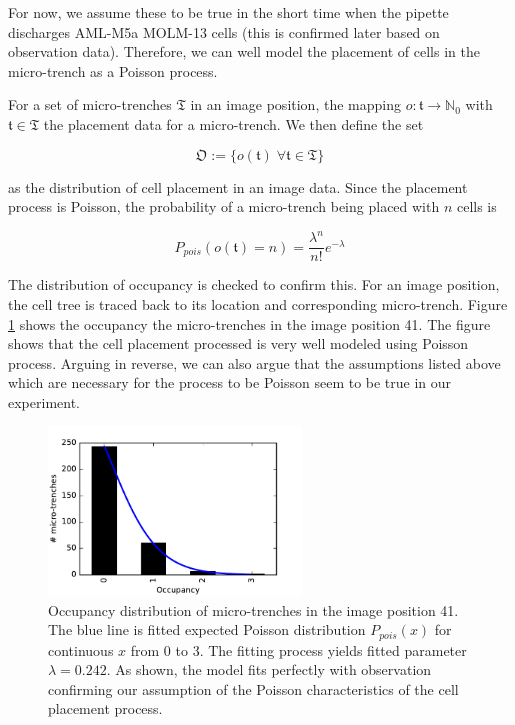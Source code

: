 \documentclass[pdftex,12pt,a4paper]{report}
\begin{document}
For now, we assume these to be true in the short time when the pipette discharges AML-M5a MOLM-13 cells (this is confirmed later based on observation data). Therefore, we can well model the placement of cells in the micro-trench as a Poisson process.

For a set of micro-trenches $\mathfrak{T}$ in an image position, the mapping $o: \mathfrak{t} \rightarrow \mathbb{N}_0$ with $\mathfrak{t} \in \mathfrak{T}$ the placement data for a micro-trench.  We then define the set

\begin{equation}
\mathfrak{O} := \{o(\mathfrak{t}) \; \forall \mathfrak{t} \in \mathfrak{T}\}
\end{equation}

as  the distribution of cell placement in an image data. Since the placement process is Poisson, the probability of a micro-trench being placed with $n$ cells is

\begin{equation}
P_{pois}(o(\mathfrak{t}) = n) = \frac{\lambda^n}{n!} e^{-\lambda}
\end{equation}

The distribution of occupancy is checked to confirm this. For an image position, the cell tree is traced back to its location and corresponding micro-trench. Figure \ref{fig:cell_placements_dist} shows the occupancy the micro-trenches in the image position 41. The figure shows that the cell placement processed is very well modeled using Poisson process. Arguing in reverse, we can also argue that the assumptions  listed above which are necessary for the process to be Poisson seem to be true in our experiment.

\begin{figure}[H]
\centering
\includegraphics[width=0.6\textwidth]{images/occupancy_distribution.pdf}
\caption[Occupancy distribution of micro-trenches in the image position 41.]{Occupancy distribution of micro-trenches in the image position 41. The blue line is fitted expected Poisson distribution $P_{pois}(x)$  for continuous $x$ from 0 to 3. The fitting process yields fitted parameter $\lambda = 0.242$. As shown, the model fits perfectly with observation confirming our assumption of the Poisson characteristics of the cell placement process.}
\label{fig:cell_placements_dist}
\end{figure}
\end{document}
